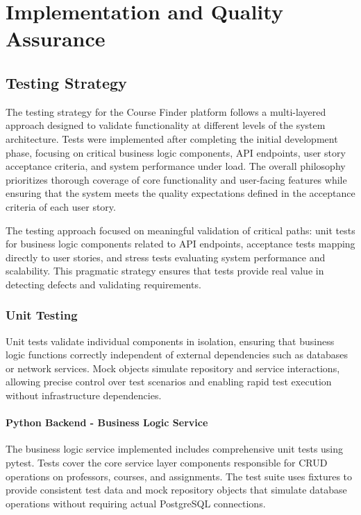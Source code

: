\documentclass[12pt,a4paper]{article}
\begin{document}
\section{Implementation and Quality Assurance} 
\label{sec:implementation}

\subsection{Testing Strategy}

The testing strategy for the Course Finder platform follows a multi-layered approach designed to validate functionality at different levels of the system architecture. Tests were implemented after completing the initial development phase, focusing on critical business logic components, API endpoints, user story acceptance criteria, and system performance under load. The overall philosophy prioritizes thorough coverage of core functionality and user-facing features while ensuring that the system meets the quality expectations defined in the acceptance criteria of each user story.\newline

The testing approach focused on meaningful validation of critical paths: unit tests for business logic components related to API endpoints, acceptance tests mapping directly to user stories, and stress tests evaluating system performance and scalability. This pragmatic strategy ensures that tests provide real value in detecting defects and validating requirements.

\subsubsection{Unit Testing}

Unit tests validate individual components in isolation, ensuring that business logic functions correctly independent of external dependencies such as databases or network services. Mock objects simulate repository and service interactions, allowing precise control over test scenarios and enabling rapid test execution without infrastructure dependencies.

\paragraph{Python Backend - Business Logic Service}

The business logic service implemented includes comprehensive unit tests using pytest. Tests cover the core service layer components responsible for CRUD operations on professors, courses, and assignments. The test suite uses fixtures to provide consistent test data and mock repository objects that simulate database operations without requiring actual PostgreSQL connections.\newline
\end{document}
